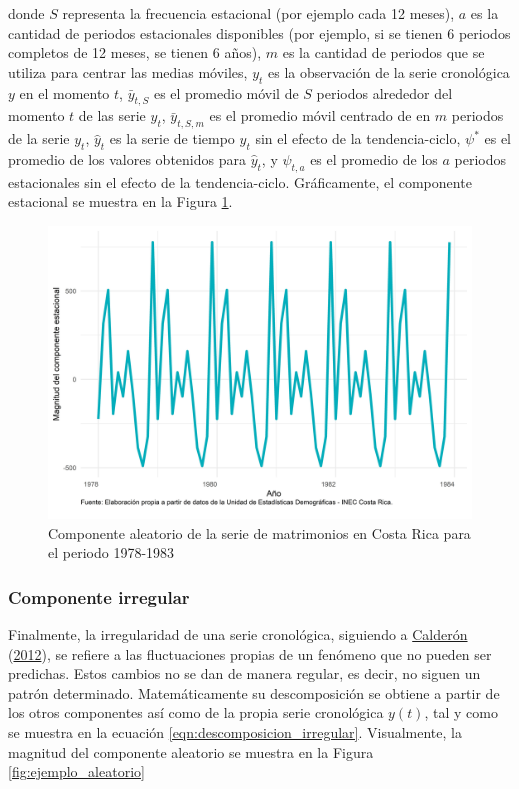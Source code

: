 \documentclass[
]{article}
\begin{document}
donde \(S\) representa la frecuencia estacional (por ejemplo cada 12
meses), \(a\) es la cantidad de periodos estacionales disponibles (por
ejemplo, si se tienen 6 periodos completos de 12 meses, se tienen 6
años), \(m\) es la cantidad de periodos que se utiliza para centrar las
medias móviles, \(y_t\) es la observación de la serie cronológica \(y\)
en el momento \(t\), \(\bar{y}_{t,S}\) es el promedio móvil de \(S\)
periodos alrededor del momento \(t\) de las serie \(y_t\),
\(\bar{y}_{t,S,m}\) es el promedio móvil centrado de en \(m\) periodos
de la serie \(y_t\), \(\hat{y}_t\) es la serie de tiempo \(y_t\) sin el
efecto de la tendencia-ciclo, \(\psi^*\) es el promedio de los valores
obtenidos para \(\hat{y}_t\), y \(\psi_{t,a}\) es el promedio de los
\(a\) periodos estacionales sin el efecto de la tendencia-ciclo.
Gráficamente, el componente estacional se muestra en la Figura
\ref{fig:ejemplo_estacional}.

\begin{figure}[H]
\includegraphics[width=1\linewidth,height=1\textheight]{Tesis_files/figure-latex/ejemplo_estacional-1} \caption{Componente aleatorio de la serie de matrimonios en Costa Rica para el periodo 1978-1983}\label{fig:ejemplo_estacional}
\end{figure}

\subsubsection{Componente irregular}

Finalmente, la irregularidad de una serie cronológica, siguiendo a
\protect\hyperlink{ref-calderon2012estadistica}{Calderón}
(\protect\hyperlink{ref-calderon2012estadistica}{2012}), se refiere a
las fluctuaciones propias de un fenómeno que no pueden ser predichas.
Estos cambios no se dan de manera regular, es decir, no siguen un patrón
determinado. Matemáticamente su descomposición se obtiene a partir de
los otros componentes así como de la propia serie cronológica \(y(t)\),
tal y como se muestra en la ecuación \ref{eqn:descomposicion_irregular}.
Visualmente, la magnitud del componente aleatorio se muestra en la
Figura \ref{fig:ejemplo_aleatorio}
\end{document}
